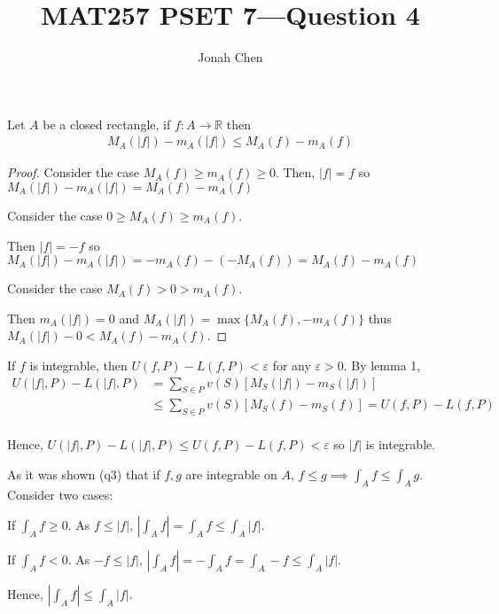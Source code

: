 \documentclass{exam}
\title{MAT257 PSET 7---Question 4}
\author{Jonah Chen}
\numberwithin{equation}{section}
\newcommand{\R}{\mathbb{R}}
\begin{document}
    \sffamily
    \maketitle
    \begin{lemma}
        Let $A$ be a closed rectangle, if $f:A\to\R$ then 
        \begin{align*}
            M_A(|f|)-m_A(|f|)\leq M_A(f)-m_A(f)
        \end{align*}
        \begin{proof}
            Consider the case $M_A(f)\geq m_A(f)\geq 0$. Then, $|f|=f$ so $M_A(|f|)-m_A(|f|)=M_A(f)-m_A(f)$
            
            \vspace{10pt}
            
            Consider the case $0\geq M_A(f)\geq m_A(f)$. 
            
            Then $|f|=-f$ so $M_A(|f|)-m_A(|f|)=-m_A(f)-(-M_A(f))=M_A(f)-m_A(f)$
            
            \vspace{10pt}
            
            Consider the case $M_A(f)>0>m_A(f)$. 
            
            Then $m_A(|f|)=0$ and $M_A(|f|)=\max\{M_A(f),-m_A(f)\}$ thus $M_A(|f|)-0<M_A(f)-m_A(f)$.
        \end{proof}
    \end{lemma}

    If $f$ is integrable, then $U(f,P)-L(f,P)<\varepsilon$ for any $\varepsilon>0$. By lemma 1,
    \begin{align*}
        U(|f|,P)-L(|f|,P)&=\sum_{S\in P}v(S)[M_S(|f|)-m_S(|f|)]\\
        &\leq\sum_{S\in P}v(S)[M_S(f)-m_S(f)]=U(f,P)-L(f,P)\\
    \end{align*} 

    Hence, $U(|f|,P)-L(|f|,P)\leq U(f,P)-L(f,P)<\varepsilon$ so $|f|$ is integrable.

    As it was shown (q3) that if $f,g$ are integrable on $A$, $f\leq g\implies\int_Af\leq\int_Ag$. Consider two cases:

    If $\int_Af\geq0$. As $f\leq|f|$, $\left|\int_Af\right|=\int_Af\leq\int_A|f|$.

    If $\int_Af<0$. As $-f\leq|f|$, $\left|\int_Af\right|=-\int_Af=\int_A-f\leq\int_A|f|$.

    Hence, $\left|\int_Af\right|\leq\int_A|f|$.
\end{document}
